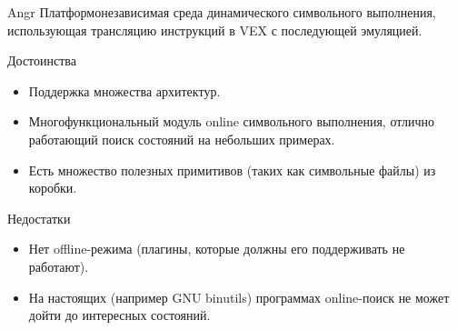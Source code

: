 \documentclass[10pt]{beamer}
\begin{document}

\begin{frame}{Angr}
    Платформонезависимая среда динамического символьного выполнения, использующая трансляцию инструкций в VEX с последующей эмуляцией.
    \begin{block}{Достоинства}
      \begin{itemize}
        \item Поддержка множества архитектур.
        \item Многофункциональный модуль online символьного выполнения, отлично работающий поиск состояний на небольших примерах.
        \item Есть множество полезных примитивов (таких как символьные файлы) из коробки.
      \end{itemize}
    \end{block}
        \begin{block}{Недостатки}
          \begin{itemize}
      \item Нет offline-режима (плагины, которые должны его поддерживать не работают).
      \item На настоящих (например GNU binutils) программах online-поиск не может дойти до интересных состояний.
      \end{itemize}
    \end{block}
\end{frame}
\end{document}
